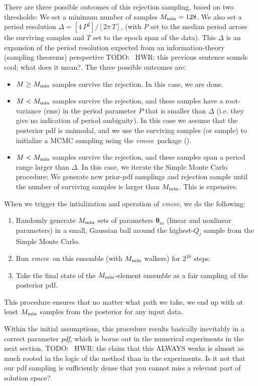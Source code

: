 \documentclass[manuscript, letterpaper]{aastex6}
\newcommand{\project}[1]{\textsl{#1}}
\newcommand{\emcee}{\project{emcee}}
\newcommand{\bs}[1]{\boldsymbol{#1}}
\newcommand{\todo}[1]{{\color{red}TODO: #1}}
\begin{document}
There are three possible outcomes of this rejection sampling, based on two
thresholds:
We set a minimum number of samples $M_{\rm min}=128$.
We also set a period resolution $\Delta = [4\,P^2] / [2\pi\,T]$, (with
$P$ set to the median period across the surviving samples and $T$ set to
the epoch span of the data).
This $\Delta$ is an expansion of the period
resolution expected from an information-theory (sampling theorems) perspective
\todo{~HWR: this previous sentence sounds cool; what does it mean?}.
The three possible outcomes are:
\begin{itemize}\itemsep0ex
\item $M\geq M_{\rm min}$ samples survive the rejection.
  In this case, we are done.
\item $M<M_{\rm min}$ samples survive the rejection, and these samples have a
  root-variance (rms) in the period parameter $P$ that is smaller than $\Delta$
  (i.e. they give no indication of period ambiguity).
  In this case we assume that the posterior pdf is unimodal, and we use the
  surviving samples (or sample) to initialize a MCMC sampling using the \emcee\
  package (\citealt{Foreman-Mackey:2013}).
\item $M<M_{\rm min}$ samples survive the rejection, and these samples
  span a period range larger than $\Delta$.
  In this case, we iterate the Simple Monte Carlo procedure: We generate new
  prior-pdf samplings and rejection sample until the number of surviving samples
  is larger than $M_{\rm min}$.
  This is expensive.
\end{itemize}
When we trigger the intialization and operation of \emcee, we do the following:
\begin{enumerate}\itemsep0ex
\item Randomly generate $M_{\rm min}$ sets of parameters $\bs{\theta}_m$
  (linear and nonlinear parameters) in a small, Gaussian ball around
  the highest-$Q_j$ sample from the Simple Monte Carlo.
\item Run \emcee\ on this ensemble (with $M_{\rm min}$ walkers) for $2^{16}$
  steps.
\item Take the final state of the $M_{\rm min}$-element ensemble as a
  fair sampling of the posterior pdf.
\end{enumerate}
This procedure ensures that no matter what path we take, we end up with
at least $M_{\rm min}$ samples from the posterior for any input data.

Within the initial assumptions, this procedure results basically inevitably in a
correct parameter {\it pdf}, which is borne out in the numerical experiments in
the next section.
\todo{~HWR: the claim that this ALWAYS works is almost as much rooted in the
logic of the method than in the experiments. Is it not that our pdf sampling is
sufficiently dense that you cannot miss a relevant part of solution space?}
\end{document}
